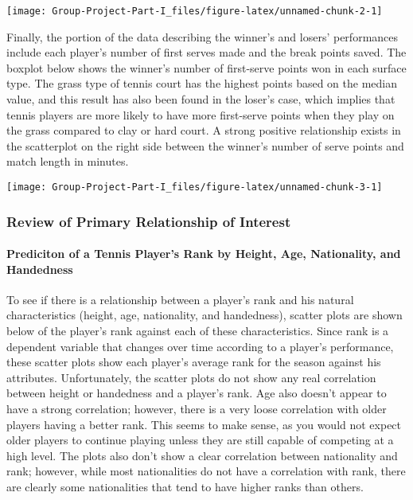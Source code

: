\documentclass[
]{article}
\begin{document}
\begin{center}\texttt{[image: Group-Project-Part-I\_files/figure-latex/unnamed-chunk-2-1]} \end{center}

Finally, the portion of the data describing the winner's and losers'
performances include each player's number of first serves made and the
break points saved. The boxplot below shows the winner's number of
first-serve points won in each surface type. The grass type of tennis
court has the highest points based on the median value, and this result
has also been found in the loser's case, which implies that tennis
players are more likely to have more first-serve points when they play
on the grass compared to clay or hard court. A strong positive
relationship exists in the scatterplot on the right side between the
winner's number of serve points and match length in minutes.

\begin{center}\texttt{[image: Group-Project-Part-I\_files/figure-latex/unnamed-chunk-3-1]} \end{center}

\hypertarget{review-of-primary-relationship-of-interest}{%
\subsubsection{Review of Primary Relationship of
Interest}\label{review-of-primary-relationship-of-interest}}

\hypertarget{prediciton-of-a-tennis-players-rank-by-height-age-nationality-and-handedness}{%
\paragraph{Prediciton of a Tennis Player's Rank by Height, Age,
Nationality, and
Handedness}\label{prediciton-of-a-tennis-players-rank-by-height-age-nationality-and-handedness}}

To see if there is a relationship between a player's rank and his
natural characteristics (height, age, nationality, and handedness),
scatter plots are shown below of the player's rank against each of these
characteristics. Since rank is a dependent variable that changes over
time according to a player's performance, these scatter plots show each
player's average rank for the season against his attributes.
Unfortunately, the scatter plots do not show any real correlation
between height or handedness and a player's rank. Age also doesn't
appear to have a strong correlation; however, there is a very loose
correlation with older players having a better rank. This seems to make
sense, as you would not expect older players to continue playing unless
they are still capable of competing at a high level. The plots also
don't show a clear correlation between nationality and rank; however,
while most nationalities do not have a correlation with rank, there are
clearly some nationalities that tend to have higher ranks than others.
\end{document}
